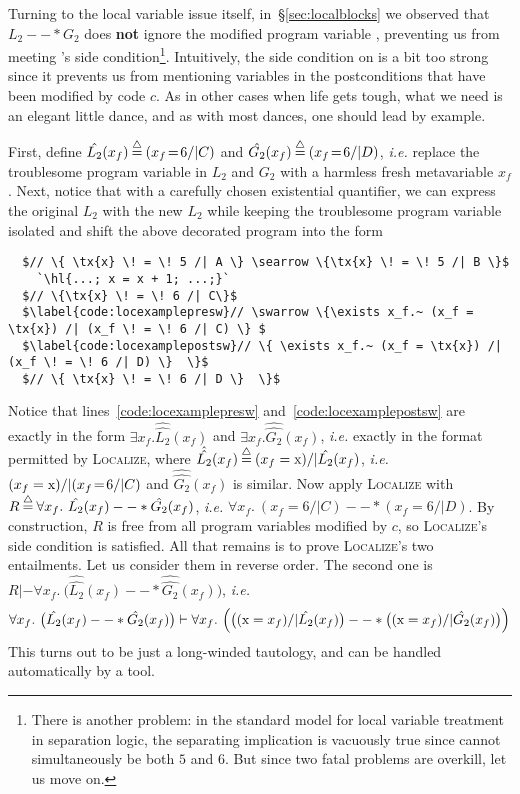 Turning to the local variable issue itself, in~\S\ref{sec:localblocks} we observed
that $L_2 --* G_2$ does \textbf{not} ignore the modified program variable ,
preventing us from meeting 's side condition\footnote{There is
another problem: in the standard model for local variable treatment in separation logic,
the separating implication is vacuously true since  cannot simultaneously be
both $5$ and $6$.  But since two fatal problems are overkill, let us move on.}.
Intuitively, the side condition on  is a bit too strong
since it prevents us from mentioning variables in the postconditions that have been modified
by code $c$.  As in other cases when life gets tough, what we need is an elegant little dance, and as with most dances, one should lead by example.

First, define $\hat{L_2}(x_f) \mathbin{\stackrel{\triangle}{=}} (x_f \! = \! 6 /| C)$ and
$\hat{G_2}(x_f) \mathbin{\stackrel{\triangle}{=}} (x_f \! = \! 6 /| D)$, \emph{i.e.} replace the troublesome program variable  in $L_2$ and $G_2$ with a harmless fresh metavariable $x_f$.  Next, notice that with a carefully chosen existential quantifier, we can express the original $L_2$ with the new $\hat{L_2}$
while keeping the troublesome program variable  isolated and shift the above decorated program
into the form
\begin{lstlisting}
  $// \{ \tx{x} \! = \! 5 /| A \} \searrow \{\tx{x} \! = \! 5 /| B \}$
    `\hl{...; x = x + 1; ...;}`
  $// \{\tx{x} \! = \! 6 /| C\}$
  $\label{code:locexamplepresw}// \swarrow \{\exists x_f.~ (x_f = \tx{x}) /| (x_f \! = \! 6 /| C) \} $
  $\label{code:locexamplepostsw}// \{ \exists x_f.~ (x_f = \tx{x}) /| (x_f \! = \! 6 /| D) \}  \}$
  $// \{ \tx{x} \! = \! 6 /| D \}  \}$
\end{lstlisting}
Notice that lines~\ref{code:locexamplepresw} and~\ref{code:locexamplepostsw}
are exactly in the form $\exists x_f. \hat{\hat{L_2}}(x_f)$ and $\exists x_f. \hat{\hat{G_2}}(x_f)$, \emph{i.e.} exactly in the format permitted by \textsc{Localize}, where $\hat{\hat{L_2}}(x_f) \mathbin{\stackrel{\triangle}{=}} (x_f = \text{x}) /| \hat{L_2}(x_f)$, \emph{i.e.} $(x_f = \text{x}) /| (x_f \! = \! 6 /| C)$ and $\hat{\hat{G_2}}(x_f)$ is similar. %
Now apply \textsc{Localize} with $R \mathbin{\stackrel{\triangle}{=}} \forall x_f.~\hat{L_2}(x_f) --* \hat{G_2}(x_f)$, \emph{i.e.} $\forall x_f.~(x_f \! = \! 6 /| C) --* (x_f \! = \! 6 /| D)$.  By construction, $R$
is free from all program variables modified by $c$, so \textsc{Localize}'s side condition is
satisfied.  All that remains is to prove \textsc{Localize}'s two entailments.  Let us consider
them in reverse order.  The second one is $R |- \forall x_f.~ \big(\hat{\hat{L_2}}(x_f) --* \hat{\hat{G_2}}(x_f)\big)$, \emph{i.e.}
\[
\forall x_f.~\big(\hat{L_2}(x_f) --* \hat{G_2}(x_f)\big) |- \forall x_f.~\Big(\big((\text{x} = x_f) /| \hat{L_2}(x_f)\big) --* \big((\text{x} = x_f) /| \hat{G_2}(x_f)\big)\Big)
\]
This turns out to be just a long-winded tautology, and can be handled automatically by a tool.


